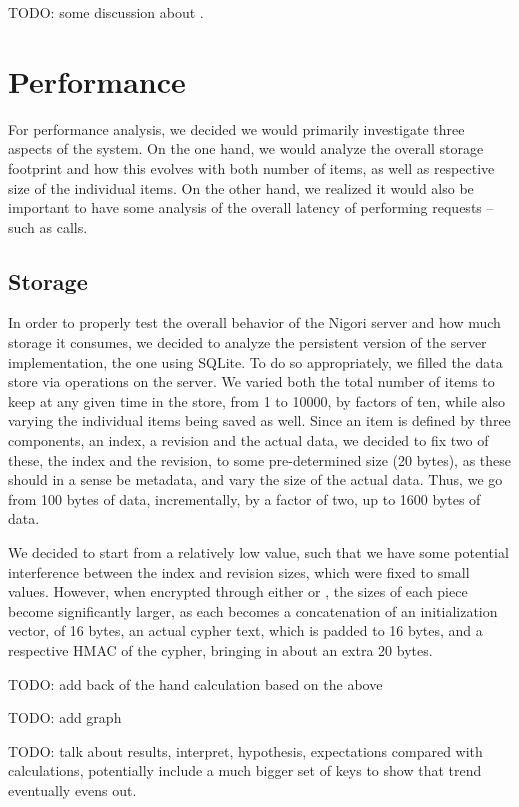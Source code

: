 TODO: some discussion about .

\section{Performance}
For performance analysis, we decided we would primarily investigate three aspects of the system.
On the one hand, we would analyze the overall storage footprint and how this evolves with both number of items, as well as respective size of the individual items.
On the other hand, we realized it would also be important to have some analysis of the overall latency of performing requests -- such as  calls.

\subsection{Storage}
In order to properly test the overall behavior of the Nigori server and how much storage it consumes, we decided to analyze the persistent version of the server implementation, the one using SQLite.
To do so appropriately, we filled the data store via  operations on the server.
We varied both the total number of items to keep at any given time in the store, from 1 to 10000, by factors of ten, while also varying the individual items being saved as well.
Since an item is defined by three components, an index, a revision and the actual data, we decided to fix two of these, the index and the revision, to some pre-determined size (20 bytes), as these should in a sense be metadata, and vary the size of the actual data.
Thus, we go from 100 bytes of data, incrementally, by a factor of two, up to 1600 bytes of data.

We decided to start from a relatively low value, such that we have some potential interference between the index and revision sizes, which were fixed to small values.
However, when encrypted through either  or , the sizes of each piece become significantly larger, as each becomes a concatenation of an  initialization vector, of 16 bytes, an actual  cypher text, which is padded to 16 bytes, and a respective HMAC of the cypher, bringing in about an extra 20 bytes.

TODO: add back of the hand calculation based on the above

TODO: add graph

TODO: talk about results, interpret, hypothesis, expectations compared with calculations, potentially include a much bigger set of keys to show that trend eventually evens out.

